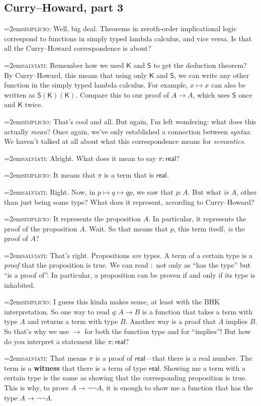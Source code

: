 \documentclass[11pt,paper=letter]{scrartcl}
\newcommand{\sf}{\mathsf}
\renewcommand{\lnot}{\neg}
\newcommand{\simp}{\vspace{0.5em}\noindent\hangindent=2em\textsc{simplicio:} }
\newcommand{\salv}{\vspace{0.5em}\noindent\hangindent=2em\textsc{salviati:} }
\begin{document}
\subsection{Curry--Howard, part 3}

\simp Well, big deal. Theorems in zeroth-order implicational logic correspond to functions in simply typed lambda calculus, and vice versa. Is that all the Curry--Howard correspondence is about?

\salv Remember how we used $\sf{K}$ and $\sf{S}$ to get the deduction theorem? By Curry--Howard, this means that using only $\sf{K}$ and $\sf{S}$, we can write any other function in the simply typed lambda calculus. For example, $x \mapsto x$ can also be written as $\sf{S}(\sf{K})(\sf{K})$. Compare this to our proof of $A \to A$, which uses $\sf{S}$ once and $\sf{K}$ twice.

\simp That's cool and all. But again, I'm left wondering: what does this actually \emph{mean}? Once again, we've only established a connection between \emph{syntax}. We haven't talked at all about what this correspondence means for \emph{semantics}.

\salv Alright. What does it mean to say $\pi : \sf{real}$?

\simp It means that $\pi$ is a term that is $\sf{real}$.

\salv Right. Now, in $p \mapsto q \mapsto qp$, we saw that $p : A$. But what \emph{is} $A$, other than just being some type? What does it represent, according to Curry--Howard?

\simp It represents the proposition $A$. In particular, it represents the proof of the proposition $A$. Wait. So that means that $p$, this term itself, \emph{is} the proof of $A$?

\salv That's right. Propositions \emph{are} types. A term of a certain type is a \emph{proof} that the proposition is true. We can read $:$ not only as ``has the type'' but ``is a proof of''. In particular, a proposition can be proven if and only if its type is inhabited.

\simp I guess this kinda makes sense, at least with the BHK interpretation. So one way to read $q : A \to B$ is a function that takes a term with type $A$ and returns a term with type $B$. Another way is a proof that $A$ implies $B$. So that's why we use $\to$ for both the function type and for ``implies''! But how do you interpret a statement like $\pi : \sf{real}$?

\salv That means $\pi$ is a proof of $\sf{real}$---that there is a real number. The term is a \textbf{witness} that there is a term of type $\sf{real}$. Showing me a term with a certain type is the same as showing that the corresponding proposition is true. This is why, to prove $A \to \lnot\lnot A$, it is enough to show me a function that has the type $A \to \lnot\lnot A$.
\end{document}
